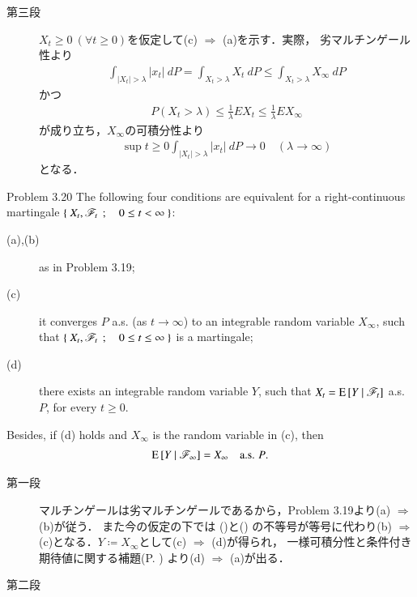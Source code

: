 \begin{prf}
\begin{description}
			\item[第三段]
				$X_t \geq 0\ (\forall t \geq 0)$を仮定して(c) $\Rightarrow$ (a)を示す．実際，
				劣マルチンゲール性より
				\begin{align}
					\int_{|X_t| > \lambda} |x_t|\ dP
					= \int_{X_t > \lambda} X_t\ dP
					\leq \int_{X_t > \lambda} X_\infty\ dP
				\end{align}
				かつ
				\begin{align}
					P\left( X_t > \lambda \right)
					\leq \frac{1}{\lambda} EX_t
					\leq \frac{1}{\lambda} EX_\infty
				\end{align}
				が成り立ち，$X_\infty$の可積分性より
				\begin{align}
					\sup{t \geq 0}{\int_{|X_t| > \lambda} |x_t|\ dP} 
					\longrightarrow 0
					\quad (\lambda \longrightarrow \infty)
				\end{align}
				となる．
				\QED
		\end{description}
	\end{prf}
	
	\begin{itembox}[l]{Problem 3.20}
		The following four conditions are equivalent for a right-continuous martingale
		$\left\{\ X_t,\mathscr{F}_t\ \, ; \quad 0 \leq t < \infty\ \right\}$:
		\begin{description}
			\item[(a),(b)] as in Problem 3.19;
			\item[(c)] it converges $P$ a.s. (as $t \to \infty$) to an integrable random variable $X_\infty$,
				such that $\left\{\ X_t,\mathscr{F}_t\ \, ; \quad 0 \leq t \leq \infty\ \right\}$ is a martingale;
			\item[(d)] there exists an integrable random variable $Y$, such that $X_t = \operatorname{E} \left[ Y \ \middle|\ \mathscr{F}_t \right]$ a.s. $P$,
				for every $t \geq 0$.
		\end{description}
		Besides, if (d) holds and $X_\infty$ is the random variable in (c), then
		\begin{align}
			\operatorname{E} \left[ Y \ \middle|\ \mathscr{F}_\infty \right] = X_\infty
			\quad \mbox{a.s. $P$}.
		\end{align}
	\end{itembox}
	
	\begin{prf}\mbox{}
		\begin{description}
			\item[第一段] マルチンゲールは劣マルチンゲールであるから，Problem 3.19より(a) $\Rightarrow$ (b)が従う．
				また今の仮定の下では
				()と()
				の不等号が等号に代わり(b) $\Rightarrow$ (c)となる．$Y \coloneqq X_\infty$として(c) $\Rightarrow$ (d)が得られ，
				一様可積分性と条件付き期待値に関する補題(P. \pageref{lem:uniformly_integrability_and_conditional_expectations})
				より(d) $\Rightarrow$ (a)が出る．
				
			\item[第二段]
				
		\end{description}
	\end{prf}